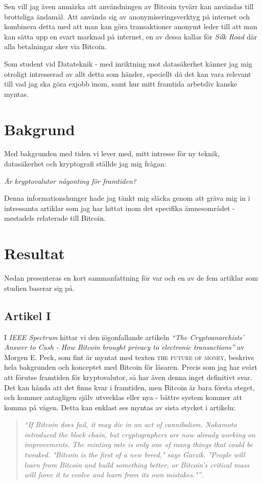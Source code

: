 \documentclass[a4paper,11pt,exjobb]{kth-mag}
\begin{document}
Sen vill jag även anmärka att användningen av Bitcoin tyvärr kan användas till brottsliga ändamål. Att använda sig av anonymiseringsverktyg på internet och kombinera detta med att man kan göra transaktioner anonymt leder till att man kan sätta upp en svart marknad på internet, en av dessa kallas för \textit{Silk Road}\cite{Christ} där alla betalningar sker via Bitcoin.

Som student vid Datateknik - med inriktning mot datasäkerhet känner jag mig otroligt intresserad av allt detta som händer, speciellt då det kan vara relevant till vad jag ska göra exjobb inom, samt hur mitt framtida arbetsliv kanske myntas. 

\section{Bakgrund}
Med bakgrunden med tiden vi lever med, mitt intresse för ny teknik, datasäkerhet och kryptografi ställde jag mig frågan:
\begin{center}
\textit{Är kryptovalutor någonting för framtiden?}
\end{center}
Denna informationshunger hade jag tänkt mig släcka genom att gräva mig in i intressanta artiklar som jag har hittat inom det specifika ämnesområdet - mestadels relaterade till Bitcoin.

\section{Resultat}
Nedan presenteras en kort sammanfattning för var och en av de fem artiklar som studien baserar sig på.

\subsection{Artikel I}
I \textit{IEEE Spectrum} hittar vi den iögonfallande artikeln \textit{``The Cryptoanarchists' Answer to Cash - How Bitcoin brought privacy to electronic transactions''}\cite{first} av Morgen E. Peck, som fint är myntat med texten \textsc{the future of money}, beskrivs hela bakgrunden och konceptet med Bitcoin för läsaren. Precis som jag har svårt att förutse framtiden för kryptovalutor, så har även denna inget definitivt svar. Det kan hända att det finns kvar i framtiden, men Bitcoin är bara första steget, och kommer antagligen själv utvecklas eller nya - bättre system kommer att komma på vägen. Detta kan enklast ses myntas av sista stycket i artikeln:
\begin{quote}
\textit{``If Bitcoin does fail, it may die in an
act of cannibalism. Nakamoto introduced the block chain, but cryptographers
are now already working on improvements. The minting rate is
only one of many things that could be tweaked. "Bitcoin is the first of
a new breed," says Garzik. "People will learn from Bitcoin and build
something better, or Bitcoin's critical mass will force it to evolve and
learn from its own mistakes."''}\cite[p.56]{first}.
\end{quote}
\end{document}
